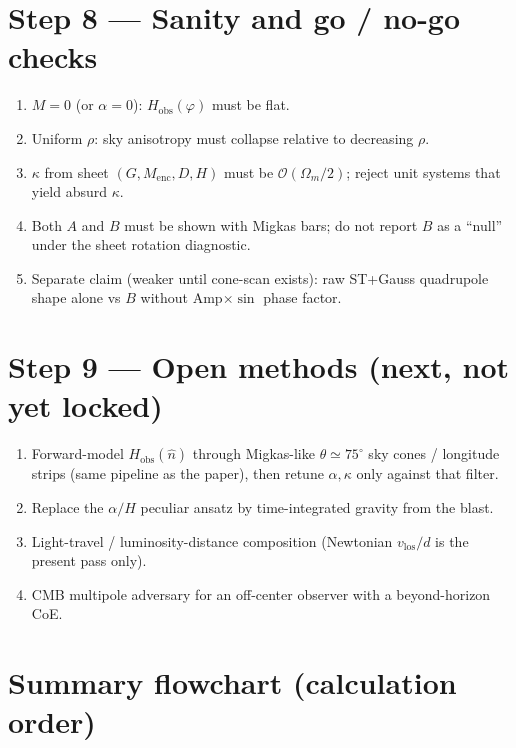 \documentclass[11pt,a4paper]{article}
\begin{document}
\section{Step 8 --- Sanity and go / no-go checks}

\begin{enumerate}[leftmargin=*]
\item \(M=0\) (or \(\alpha=0\)): \(H_{\mathrm{obs}}(\varphi)\) must be flat.
\item Uniform \(\rho\): sky anisotropy must collapse relative to decreasing \(\rho\).
\item \(\kappa\) from sheet \((G,M_{\mathrm{enc}},D,H)\) must be \(\mathcal{O}(\Omega_m/2)\); reject unit systems that yield absurd \(\kappa\).
\item Both \(A\) and \(B\) must be shown with Migkas bars; do not report \(B\) as a ``null'' under the sheet rotation diagnostic.
\item Separate claim (weaker until cone-scan exists): raw ST+Gauss quadrupole shape alone vs \(B\) without Amp\(\times\sin\) phase factor.
\end{enumerate}

\section{Step 9 --- Open methods (next, not yet locked)}

\begin{enumerate}[leftmargin=*]
\item Forward-model \(H_{\mathrm{obs}}(\hat{n})\) through Migkas-like \(\theta\simeq 75^\circ\) sky cones / longitude strips (same pipeline as the paper), then retune \(\alpha,\kappa\) only against that filter.
\item Replace the \(\alpha/H\) peculiar ansatz by time-integrated gravity from the blast.
\item Light-travel / luminosity-distance composition (Newtonian \(v_{\mathrm{los}}/d\) is the present pass only).
\item CMB multipole adversary for an off-center observer with a beyond-horizon CoE.
\end{enumerate}

\section{Summary flowchart (calculation order)}
\end{document}
